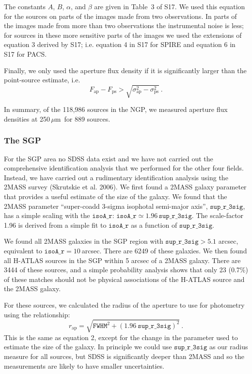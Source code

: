 \documentclass[a4paper,fleqn,usenatbib, twocolumn]{aastex61}
\def\mic{\,$\mu $m}
\begin{document}
The constants $A$, $B$, $\alpha$, and $\beta$ are given in Table~3 of
S17.  We used this equation for the sources on parts of the images
made from two observations. In parts of the images made from more than
two observations the instrumental noise is less; for sources in these
more sensitive parts of the images we used the extensions of equation
3 derived by S17; i.e. equation 4 in S17 for SPIRE and equation 6 in
S17 for PACS.

Finally, we only used the aperture flux density if
it is significantly larger than the point-source estimate, i.e.
\begin{equation}
F_\mathrm{ap}- F_\mathrm{ps}>\sqrt{\sigma_\mathrm{ap}^2-\sigma_\mathrm{ps}^2}
\ .
\end{equation}

In summary, of the 118,986 sources in the NGP, we measured aperture
flux densities at 250\mic\ for 889 sources. 

\subsubsection{The SGP}

For the SGP area no SDSS data exist and we have not carried out the
comprehensive identification analysis that we performed for the other
four fields. Instead, we have carried out a rudimentary identification
analysis using the 2MASS survey (Skrutskie et al. 2006). We first
found a 2MASS galaxy parameter that provides a useful estimate of the
size of the galaxy. We found that the 2MASS parameter ``super-coadd
3-sigma isophotal semi-major axis'', $\mathtt{sup\_r\_3sig}$, has a
simple scaling with the $\mathtt {isoA\_r}$:
$\mathtt{isoA\_r} \simeq 1.96\, \mathtt{sup\_r\_3sig}$.  The
scale-factor 1.96 is derived from a simple fit to $\mathtt{isoA\_r}$
as a function of $\mathtt{sup\_r\_3sig}$.
  
We found all 2MASS galaxies in the SGP region with
$\mathtt{sup\_r\_3sig}>5.1$ arcsec, equivalent to
$\mathtt{isoA\_r}=10\ $arcsec. There are 6249 of these galaxies. We
then found all H-ATLAS sources in the SGP within 5 arcsec of a 2MASS
galaxy. There are 3444 of these sources, and a simple probability
analysis shows that only 23 (0.7\%) of these matches should not be
physical associations of the H-ATLAS source and the 2MASS galaxy.

For these sources, we calculated the radius of the aperture
to use for photometry using the relationship:
\smallskip
\begin{equation} 
r_\mathrm{ap} = \sqrt{ \mathtt{FWHM}^2 + {(1.96
    \ \mathtt{sup\_r\_3sig})}^2}\ .
\end{equation}
This is the same as equation 2, except for the change
in the parameter used to estimate the size of the galaxy.
In principle we could use $\mathtt{sup\_r\_3sig}$ as our radius
measure for all sources, but SDSS is significantly deeper than 2MASS
and so the measurements are likely to have smaller uncertainties. 
\end{document}
